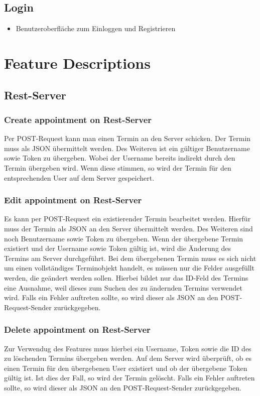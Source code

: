 \documentclass[12pt]{scrartcl}
\begin{document}
    \subsection{Login}
    \begin{itemize}
        \item Benutzeroberfläche zum Einloggen und Registrieren
    \end{itemize}
    

    \section{Feature Descriptions}
    \subsection{Rest-Server}
    \subsubsection{Create appointment on Rest-Server}
        Per POST-Request kann man einen Termin an den Server schicken.
        Der Termin muss als JSON übermittelt werden. Des Weiteren ist ein gültiger Benutzername sowie Token zu übergeben. Wobei der Username 
        bereits indirekt durch den Termin übergeben wird.
        Wenn diese stimmen, so wird der Termin für den entsprechenden User auf dem Server gespeichert.
    
    \subsubsection{Edit appointment on Rest-Server}
        Es kann per POST-Request ein existierender Termin bearbeitet werden. Hierfür muss der Termin als JSON an den Server übermittelt werden.
        Des Weiteren sind noch Benutzername sowie Token zu übergeben. Wenn der übergebene Termin existiert und der Username sowie Token gültig ist, 
        wird die Änderung des Termins am Server durchgeführt. Bei dem übergebenen Termin muss es sich nicht um einen vollständiges Terminobjekt handelt, es 
        müssen nur die Felder ausgefüllt werden, die geändert werden sollen. Hierbei bildet nur das ID-Feld des Termins eine Ausnahme, weil dieses zum Suchen 
        des zu ändernden Termins verwendet wird.
        Falls ein Fehler auftreten sollte, so wird dieser als JSON an den POST-Request-Sender zurückgegeben.

    \subsubsection{Delete appointment on Rest-Server}
        Zur Verwendug des Features muss hierbei ein Username, Token sowie die ID des zu löschenden Termins übergeben werden.
        Auf dem Server wird überprüft, ob es einen Termin für den übergebenen User existiert und ob der übergebene Token gültig ist.
        Ist dies der Fall, so wird der Termin gelöscht.
        Falls ein Fehler auftreten sollte, so wird dieser als JSON an den POST-Request-Sender zurückgegeben.
    
\end{document}

